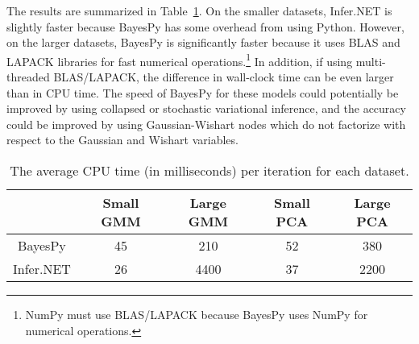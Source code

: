 \documentclass[twoside,11pt]{article}
\begin{document}
The results are summarized in Table~\ref{tab:speed}.  On the smaller datasets,
Infer.NET is slightly faster because BayesPy has some overhead from using
Python.  However, on the larger datasets, BayesPy is significantly faster
because it uses BLAS and LAPACK libraries for fast numerical
operations.\footnote{NumPy must use BLAS/LAPACK because BayesPy uses NumPy for
  numerical operations.}  In addition, if using multi-threaded BLAS/LAPACK, the
difference in wall-clock time can be even larger than in CPU time.  The speed of
BayesPy for these models could potentially be improved by using collapsed or
stochastic variational inference, and the accuracy could be improved by using
Gaussian-Wishart nodes which do not factorize with respect to the Gaussian and
Wishart variables.

\begin{table}[tb]
  \centering
  \caption{The average CPU time (in milliseconds) per iteration for each dataset.}
  \small
  \begin{tabular}{ccccc}
    &
    Small GMM
    &
    Large GMM
    &
    Small PCA
    &
    Large PCA
    \\
    \hline
    BayesPy     & 45 & 210  & 52 & 380
    \\
    Infer.NET   & 26 & 4400 & 37 & 2200
  \end{tabular}
  \label{tab:speed}
\end{table}













\end{document}
